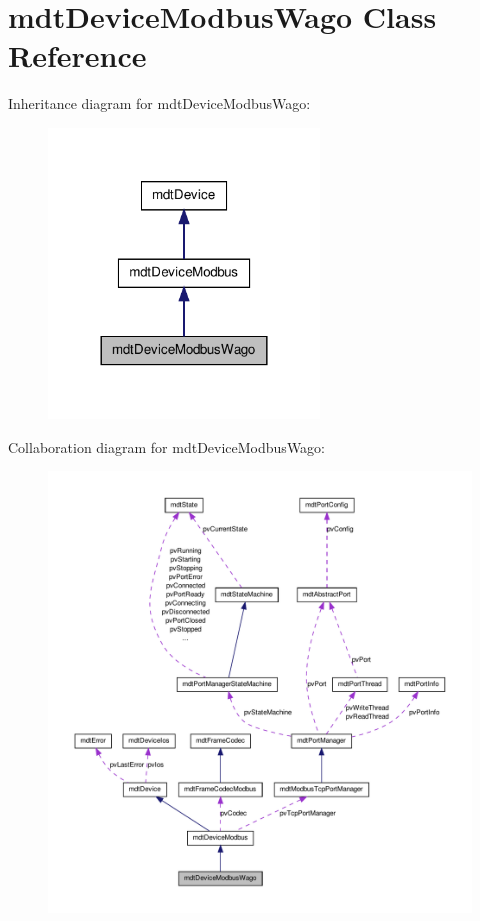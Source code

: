 \hypertarget{classmdt_device_modbus_wago}{
\section{mdtDeviceModbusWago Class Reference}
\label{classmdt_device_modbus_wago}
}


Inheritance diagram for mdtDeviceModbusWago:\nopagebreak
\begin{figure}[H]
\begin{center}
\leavevmode
\includegraphics[width=204pt]{classmdt_device_modbus_wago__inherit__graph}
\end{center}
\end{figure}


Collaboration diagram for mdtDeviceModbusWago:\nopagebreak
\begin{figure}[H]
\begin{center}
\leavevmode
\includegraphics[width=400pt]{classmdt_device_modbus_wago__coll__graph}
\end{center}
\end{figure}
